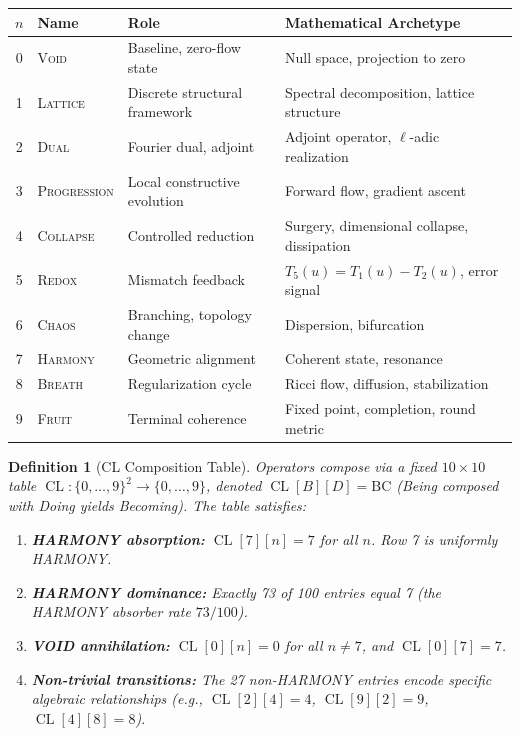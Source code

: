 \documentclass[11pt]{article}
\newtheorem{definition}[theorem]{Definition}
\DeclareMathOperator{\CL}{CL}
\begin{document}
\begin{center}
\begin{tabular}{@{}clll@{}}
\toprule
$n$ & Name & Role & Mathematical Archetype \\
\midrule
0 & \textsc{Void} & Baseline, zero-flow state & Null space, projection to zero \\
1 & \textsc{Lattice} & Discrete structural framework & Spectral decomposition, lattice structure \\
2 & \textsc{Dual} & Fourier dual, adjoint & Adjoint operator, $\ell$-adic realization \\
3 & \textsc{Progression} & Local constructive evolution & Forward flow, gradient ascent \\
4 & \textsc{Collapse} & Controlled reduction & Surgery, dimensional collapse, dissipation \\
5 & \textsc{Redox} & Mismatch feedback & $T_5(u) = T_1(u) - T_2(u)$, error signal \\
6 & \textsc{Chaos} & Branching, topology change & Dispersion, bifurcation \\
7 & \textsc{Harmony} & Geometric alignment & Coherent state, resonance \\
8 & \textsc{Breath} & Regularization cycle & Ricci flow, diffusion, stabilization \\
9 & \textsc{Fruit} & Terminal coherence & Fixed point, completion, round metric \\
\bottomrule
\end{tabular}
\end{center}

\begin{definition}[CL Composition Table]
\label{def:cl}
Operators compose via a fixed $10 \times 10$ table
$\CL : \{0,\ldots,9\}^2 \to \{0,\ldots,9\}$, denoted
$\CL[B][D] = \mathrm{BC}$ (Being composed with Doing yields Becoming).
The table satisfies:
\begin{enumerate}
\item \textbf{HARMONY absorption:} $\CL[7][n] = 7$ for all $n$.
Row 7 is uniformly HARMONY.
\item \textbf{HARMONY dominance:} Exactly 73 of 100 entries equal 7
(the HARMONY absorber rate $73/100$).
\item \textbf{VOID annihilation:} $\CL[0][n] = 0$ for all
$n \neq 7$, and $\CL[0][7] = 7$.
\item \textbf{Non-trivial transitions:} The 27 non-HARMONY entries
encode specific algebraic relationships (e.g.,
$\CL[2][4] = 4$, $\CL[9][2] = 9$, $\CL[4][8] = 8$).
\end{enumerate}
\end{definition}
\end{document}
